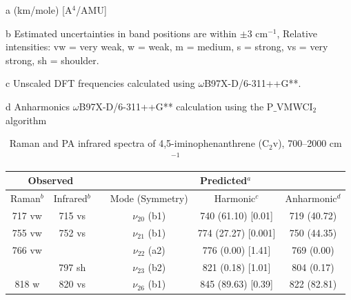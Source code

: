 \begin{table}[H]
\begin{center}
\begin{threeparttable}
\begin{tabular}{c c c c c c}
		\bottomrule
		
	\end{tabular}
	
	\begin{tablenotes}
		\item[a] (km/mole) [A$^{4}$/AMU]
		\item[b] Estimated uncertainties in band positions are within $\pm$3 cm$^{-1}$, Relative intensities: vw = very weak, w = weak, m = medium, s = strong, vs = very strong, sh = shoulder.
		\item[c] Unscaled DFT frequencies calculated using $\omega$B97X-D/6-311++G**.
		\item[d] Anharmonics $\omega$B97X-D/6-311++G** calculation using the P$\_$VMWCI$_{2}$ algorithm
	\end{tablenotes}
\end{threeparttable}
\end{center}
\label{lowfreq-45-imino}
\end{table}
	
	
	
	
	
	\begin{table}[H]
		\caption{Raman and PA infrared spectra of 4,5-iminophenanthrene (C$_{2}$v), 700–2000 cm$^{-1}$}
		\begin{center}
				\begin{tabular}{c c c c c c}
					\hline
					\multicolumn{ 2}{c}{Observed} & \multicolumn{1}{c}{} & \multicolumn{ 3}{c}{Predicted$^{a}$} \\ \hline
					Raman$^{b}$ & \multicolumn{1}{c}{Infrared$^{b}$} &  & \multicolumn{1}{c}{Mode (Symmetry)} & \multicolumn{1}{c}{Harmonic$^{c}$} & Anharmonic$^{d}$ \\ \hline
	717 vw & 715 vs & & $\nu_{20}$ (b1) & 740 (61.10) [0.01] & 719 (40.72) \\ 
	755 vw & 752 vs & &$\nu_{21}$  (b1)& 774 (27.27) [0.001] & 750 (44.35) \\ 
	766 vw &  & &$\nu_{22}$ (a2) & 776 (0.00) [1.41] & 769 (0.00) \\ 
	& 797 sh & &$\nu_{23}$ (b2)& 821 (0.18) [1.01] & 804 (0.17) \\ 
	818 w & 820 vs & & $\nu_{26}$ (b1) & 845 (89.63) [0.39] & 822 (82.81) \\ 
	\bottomrule
\end{tabular}
\end{center}
\end{table}




